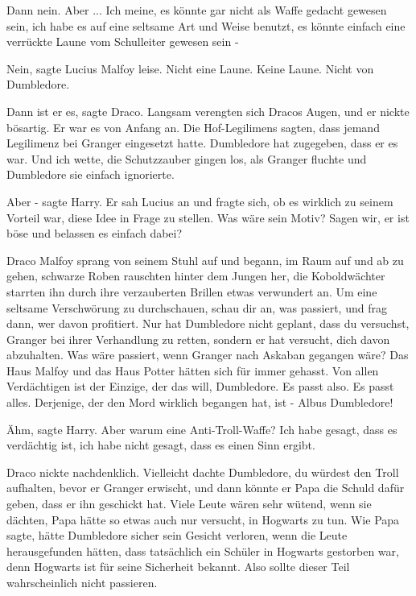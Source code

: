 \glqq{}Dann nein. Aber ... Ich meine, es könnte gar nicht als Waffe gedacht
gewesen sein, ich habe es auf eine seltsame Art und Weise benutzt, es könnte
einfach eine verrückte Laune vom Schulleiter gewesen sein -\grqq{}

\glqq{}Nein\grqq{}, sagte Lucius Malfoy leise. \glqq{}Nicht eine Laune. Keine
Laune. Nicht von Dumbledore.\grqq{}

\glqq{}Dann ist er es\grqq{}, sagte Draco. Langsam verengten sich Dracos Augen,
und er nickte bösartig. \glqq{}Er war es von Anfang an. Die Hof-Legilimens
sagten, dass jemand Legilimenz bei Granger eingesetzt hatte. Dumbledore hat
zugegeben, dass er es war. Und ich wette, die Schutzzauber gingen los, als
Granger fluchte und Dumbledore sie einfach ignorierte.\grqq{}

\glqq{}Aber -\grqq{} sagte Harry. Er sah Lucius an und fragte sich, ob es
wirklich zu seinem Vorteil war, diese Idee in Frage zu stellen. \glqq{}Was wäre
sein Motiv? Sagen wir, er ist böse und belassen es einfach dabei?\grqq{}

Draco Malfoy sprang von seinem Stuhl auf und begann, im Raum auf und ab zu
gehen, schwarze Roben rauschten hinter dem Jungen her, die Koboldwächter
starrten ihn durch ihre verzauberten Brillen etwas verwundert an. \glqq{}Um eine
seltsame Verschwörung zu durchschauen, schau dir an, was passiert, und frag
dann, wer davon profitiert. Nur hat Dumbledore nicht geplant, dass du versuchst,
Granger bei ihrer Verhandlung zu retten, sondern er hat versucht, dich davon
abzuhalten. Was wäre passiert, wenn Granger nach Askaban gegangen wäre? Das Haus
Malfoy und das Haus Potter hätten sich für immer gehasst. Von allen Verdächtigen
ist der Einzige, der das will, Dumbledore. Es passt also. Es passt alles.
Derjenige, der den Mord wirklich begangen hat, ist - Albus Dumbledore!\grqq{}

\glqq{}Ähm\grqq{}, sagte Harry. \glqq{}Aber warum eine Anti-Troll-Waffe? Ich habe
gesagt, dass es verdächtig ist, ich habe nicht gesagt, dass es einen Sinn
ergibt.\grqq{}

Draco nickte nachdenklich. \glqq{}Vielleicht dachte Dumbledore, du würdest den
Troll aufhalten, bevor er Granger erwischt, und dann könnte er Papa die Schuld
dafür geben, dass er ihn geschickt hat. Viele Leute wären sehr wütend, wenn sie
dächten, Papa hätte so etwas auch nur versucht, in Hogwarts zu tun. Wie Papa
sagte, hätte Dumbledore sicher sein Gesicht verloren, wenn die Leute
herausgefunden hätten, dass tatsächlich ein Schüler in Hogwarts gestorben war,
denn Hogwarts ist für seine Sicherheit bekannt. Also sollte dieser Teil
wahrscheinlich nicht passieren.\grqq{}

